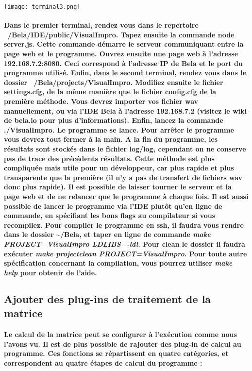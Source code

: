 \documentclass[a4paper]{article}
\begin{document}
\texttt{[image: terminal3.png]}

\paragraph{Dans le premier terminal, rendez vous dans le repertoire
~/Bela/IDE/public/VisualImpro. Tapez ensuite la commande node server.js. Cette
commande démarre le serveur communiquant entre la page web et le programme.
Ouvrez ensuite une page web à l’adresse 192.168.7.2:8080. Ceci correspond à
l’adresse IP de Bela et le port du programme utilisé. Enfin, dans le second
terminal, rendez vous dans le dossier ~/Bela/projects/VisualImpro. Modifiez
ensuite le fichier settings.cfg, de la même manière que le fichier config.cfg de
la première méthode. Vous devrez importer vos fichier wav manuellement, ou via
l’IDE Bela à l’adresse 192.168.7.2 (visitez le wiki de bela.io pour plus
d’informations). Enfin, lancez la commande ./VisualImpro. Le programme se lance.
Pour arrêter le programme vous devrez tout fermer à la main. A la fin du
programme, les résultats sont stockés dans le fichier log/log, cependant on ne
conserve pas de trace des précédents résultats. Cette méthode est plus
compliquée mais utile pour un développeur, car plus rapide et plus transparente
que la première (il n’y a pas de transfert de fichiers wav donc plus rapide). Il
est possible de laisser tourner le serveur et la page web et de ne relancer que
le programme à chaque fois. Il est aussi possible de lancer le programme via
l’IDE plutôt qu’en ligne de commande, en spécifiant les bons flags au
compilateur si vous recompilez. Pour compiler le programme en ssh, il faudra
vous rendre dans le dossier \textasciitilde/Bela, et taper en ligne de commande
\textit{make PROJECT=VisualImpro LDLIBS=-ldl}. Pour clean le dossier il faudra
exécuter \textit{make projectclean PROJECT=VisualImpro}. Pour toute autre
spécification concernant la compilation, vous pourrez utiliser \textit{make
help} pour obtenir de l'aide.}

\subsection{Ajouter des plug-ins de traitement de la matrice} \paragraph{Le
calcul de la matrice peut se configurer à l’exécution comme nous l’avons vu. Il
est de plus possible de rajouter des plug-in de calcul au programme. Ces
fonctions se répartissent en quatre catégories, et correspondent au quatre
étapes de calcul du programme :}
\end{document}
